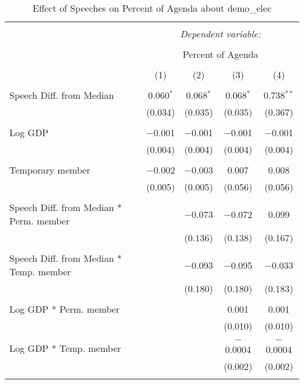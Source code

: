 
\begin{table}[!htbp] \centering 
  \caption{Effect of Speeches on Percent of Agenda about demo_elec} 
  \label{} 
\begin{tabular}{@{\extracolsep{5pt}}lcccc} 
\\[-1.8ex]\hline 
\hline \\[-1.8ex] 
 & \multicolumn{4}{c}{\textit{Dependent variable:}} \\ 
\cline{2-5} 
\\[-1.8ex] & \multicolumn{4}{c}{Percent of Agenda} \\ 
\\[-1.8ex] & (1) & (2) & (3) & (4)\\ 
\hline \\[-1.8ex] 
 Speech Diff. from Median & 0.060$^{*}$ & 0.068$^{*}$ & 0.068$^{*}$ & 0.738$^{**}$ \\ 
  & (0.034) & (0.035) & (0.035) & (0.367) \\ 
  & & & & \\ 
 Log GDP & $-$0.001 & $-$0.001 & $-$0.001 & $-$0.001 \\ 
  & (0.004) & (0.004) & (0.004) & (0.004) \\ 
  & & & & \\ 
 Temporary member & $-$0.002 & $-$0.003 & 0.007 & 0.008 \\ 
  & (0.005) & (0.005) & (0.056) & (0.056) \\ 
  & & & & \\ 
 Speech Diff. from Median * Perm. member &  & $-$0.073 & $-$0.072 & 0.099 \\ 
  &  & (0.136) & (0.138) & (0.167) \\ 
  & & & & \\ 
 Speech Diff. from Median * Temp. member &  & $-$0.093 & $-$0.095 & $-$0.033 \\ 
  &  & (0.180) & (0.180) & (0.183) \\ 
  & & & & \\ 
 Log GDP * Perm. member &  &  & 0.001 & 0.001 \\ 
  &  &  & (0.010) & (0.010) \\ 
  & & & & \\ 
 Log GDP * Temp. member &  &  & $-$0.0004 & $-$0.0004 \\ 
  &  &  & (0.002) & (0.002) \\ 
  & & & & \\ 

\end{tabular}
\end{table}
